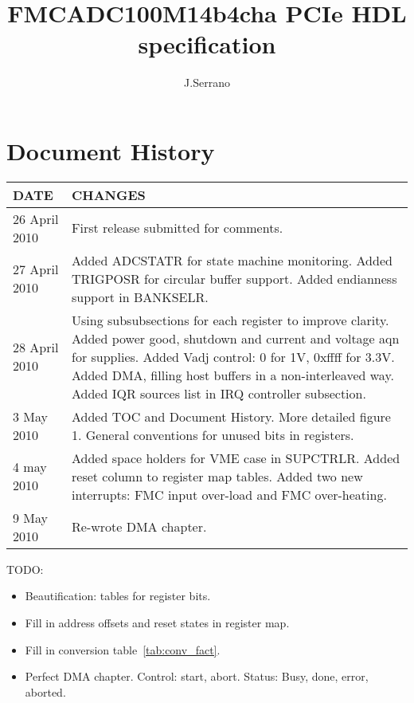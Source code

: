 \documentclass{article}
\title{FMCADC100M14b4cha PCIe HDL specification}
\author{J.Serrano}
\begin{document}
\maketitle
\pagebreak

\section*{Document History}
\begin{table}[htbp]
  \centering
  \begin{tabularx}{\textwidth}{|l|X|}
    \hline
    \textbf{DATE} & \textbf{CHANGES} \\
    \hline
    \hline
    26 April 2010 & First release submitted for comments.\\
    \hline
    27 April 2010 & Added ADCSTATR for state machine monitoring. Added TRIGPOSR for circular buffer support. Added endianness support in BANKSELR.\\
    \hline
    28 April 2010 & Using subsubsections for each register to improve clarity. Added power good, shutdown and current and voltage aqn for supplies. Added Vadj control: 0 for 1V, 0xffff for 3.3V. Added DMA, filling host buffers in a non-interleaved way. Added IQR sources list in IRQ controller subsection.\\
    \hline
    3 May 2010 & Added TOC and Document History. More detailed figure 1. General conventions for unused bits in registers. \\ 
    \hline
    4 may 2010 & Added space holders for VME case in SUPCTRLR. Added reset column to register map tables. Added two new interrupts: FMC input over-load and FMC over-heating.\\
    \hline
    9 May 2010 & Re-wrote DMA chapter.\\
    \hline
  \end{tabularx}
\end{table}

TODO: 
\begin{itemize}
\item Beautification: tables for register bits.
\item Fill in address offsets and reset states in register map.
\item Fill in conversion table~\ref{tab:conv_fact}.
\item Perfect DMA chapter. Control: start, abort. Status: Busy, done, error, aborted.
\end{itemize}

\pagebreak
\end{document}
